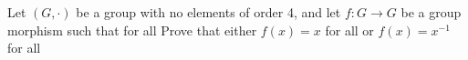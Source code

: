 Let $(G,\cdot)$ be a group with no elements of order 4, and let
$f:G\rightarrow G$ be a group morphism such that  for
all  Prove that either $f(x)=x$ for all  or $f(x)=x^{-1}$
for all 